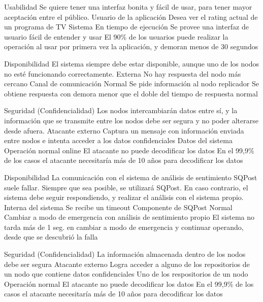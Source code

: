 \begin{enumerate}
\QA
  {Usabilidad} %
  {Se quiere tener una interfaz bonita y fácil de usar, para tener mayor aceptación entre el público.} %
  {Usuario de la aplicación} %
  {Desea ver el rating actual de un programa de TV} %
  {Sistema} %
  {En tiempo de ejecución} %
  {Se provee una interfaz de usuario fácil de entender y usar} %
  {El 90\% de los usuarios puede realizar la operación al usar por primera vez la aplicación, y demoran menos de 30 segundos} %

\QA
  {Disponibilidad} %
  {El sistema siempre debe estar disponible, aunque uno de los nodos no esté funcionando correctamente.} %
  {Externa} %
  {No hay respuesta del nodo más cercano} %
  {Canal de comunicación} %
  {Normal} %
  {Se pide información al nodo replicador} %
  {Se obtiene respuesta con demora menor que el doble del tiempo de respuesta normal} %

\QA
  {Seguridad (Confidencialidad)} %
  {Los nodos intercambiarán datos entre sí, y la información que se transmite entre los nodos debe ser segura y no poder alterarse desde afuera.} %
  {Atacante externo} %
  {Captura un mensaje con información enviada entre nodos e intenta acceder a los datos confidenciales} %
  {Datos del sistema} %
  {Operación normal online} %
  {El atacante no puede decodificar los datos} %
  {En el 99,9\% de los casos el atacante necesitaría más de 10 años para decodificar los datos} %

\QA
  {Disponibilidad} %
  {La comunicación con el sistema de análisis de sentimiento SQPost suele fallar. Siempre que sea posible, se utilizará SQPost. En caso contrario, el sistema debe seguir respondiendo, y realizar el análisis con el sistema propio.} %
  {Interna del sistema} %
  {Se recibe un timeout} %
  {Componente de SQPost} %
  {Normal} %
  {Cambiar a modo de emergencia con análisis de sentimiento propio} %
  {El sistema no tarda más de 1 seg. en cambiar a modo de emergencia y continuar operando, desde que se descubrió la falla} %

  {Seguridad (Confidencialidad)} %
  {La información almacenada dentro de los nodos debe ser segura} %
  {Atacante externo} %
  {Logra acceder a alguno de los repositorios de un nodo que contiene datos confidenciales} %
  {Uno de los respositorios de un nodo} %
  {Operación normal} %
  {El atacante no puede decodificar los datos} %
  {En el 99,9\% de los casos el atacante necesitaría más de 10 años para decodificar los datos} %
  

\end{enumerate}
